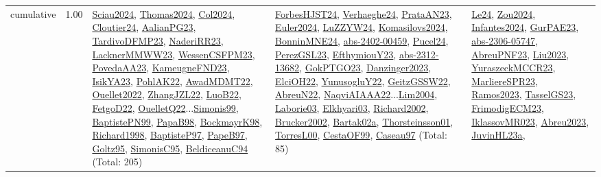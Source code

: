 {\begin{longtable}{p{3cm}r>{\raggedright\arraybackslash}p{6cm}>{\raggedright\arraybackslash}p{6cm}>{\raggedright\arraybackslash}p{8cm}}
\index{cumulative}\index{Constraints!cumulative}cumulative &  1.00 & \hyperref[detail:Sciau2024]{Sciau2024}, \hyperref[detail:Thomas2024]{Thomas2024}, \hyperref[detail:Col2024]{Col2024}, \hyperref[detail:Cloutier24]{Cloutier24}, \hyperref[detail:AalianPG23]{AalianPG23}, \hyperref[detail:TardivoDFMP23]{TardivoDFMP23}, \hyperref[detail:NaderiRR23]{NaderiRR23}, \hyperref[detail:LacknerMMWW23]{LacknerMMWW23}, \hyperref[detail:WessenCSFPM23]{WessenCSFPM23}, \hyperref[detail:PovedaAA23]{PovedaAA23}, \hyperref[detail:KameugneFND23]{KameugneFND23}, \hyperref[detail:IsikYA23]{IsikYA23}, \hyperref[detail:PohlAK22]{PohlAK22}, \hyperref[detail:AwadMDMT22]{AwadMDMT22}, \hyperref[detail:Ouellet2022]{Ouellet2022}, \hyperref[detail:ZhangJZL22]{ZhangJZL22}, \hyperref[detail:LuoB22]{LuoB22}, \hyperref[detail:FetgoD22]{FetgoD22}, \hyperref[detail:OuelletQ22]{OuelletQ22}...\hyperref[detail:Simonis99]{Simonis99}, \hyperref[detail:BaptistePN99]{BaptistePN99}, \hyperref[detail:PapaB98]{PapaB98}, \hyperref[detail:BockmayrK98]{BockmayrK98}, \hyperref[detail:Richard1998]{Richard1998}, \hyperref[detail:BaptisteP97]{BaptisteP97}, \hyperref[detail:PapeB97]{PapeB97}, \hyperref[detail:Goltz95]{Goltz95}, \hyperref[detail:SimonisC95]{SimonisC95}, \hyperref[detail:BeldiceanuC94]{BeldiceanuC94} (Total: 205) & \hyperref[detail:ForbesHJST24]{ForbesHJST24}, \hyperref[detail:Verhaeghe24]{Verhaeghe24}, \hyperref[detail:PrataAN23]{PrataAN23}, \hyperref[detail:Euler2024]{Euler2024}, \hyperref[detail:LuZZYW24]{LuZZYW24}, \hyperref[detail:Komasilovs2024]{Komasilovs2024}, \hyperref[detail:BonninMNE24]{BonninMNE24}, \hyperref[detail:abs-2402-00459]{abs-2402-00459}, \hyperref[detail:Pucel24]{Pucel24}, \hyperref[detail:PerezGSL23]{PerezGSL23}, \hyperref[detail:EfthymiouY23]{EfthymiouY23}, \hyperref[detail:abs-2312-13682]{abs-2312-13682}, \hyperref[detail:GokPTGO23]{GokPTGO23}, \hyperref[detail:Danzinger2023]{Danzinger2023}, \hyperref[detail:ElciOH22]{ElciOH22}, \hyperref[detail:YunusogluY22]{YunusogluY22}, \hyperref[detail:GeitzGSSW22]{GeitzGSSW22}, \hyperref[detail:AbreuN22]{AbreuN22}, \hyperref[detail:NaqviAIAAA22]{NaqviAIAAA22}...\hyperref[detail:Lim2004]{Lim2004}, \hyperref[detail:Laborie03]{Laborie03}, \hyperref[detail:Elkhyari03]{Elkhyari03}, \hyperref[detail:Richard2002]{Richard2002}, \hyperref[detail:Brucker2002]{Brucker2002}, \hyperref[detail:Bartak02a]{Bartak02a}, \hyperref[detail:Thorsteinsson01]{Thorsteinsson01}, \hyperref[detail:TorresL00]{TorresL00}, \hyperref[detail:CestaOF99]{CestaOF99}, \hyperref[detail:Caseau97]{Caseau97} (Total: 85) & \hyperref[detail:Le24]{Le24}, \hyperref[detail:Zou2024]{Zou2024}, \hyperref[detail:Infantes2024]{Infantes2024}, \hyperref[detail:GurPAE23]{GurPAE23}, \hyperref[detail:abs-2306-05747]{abs-2306-05747}, \hyperref[detail:AbreuPNF23]{AbreuPNF23}, \hyperref[detail:Liu2023]{Liu2023}, \hyperref[detail:YuraszeckMCCR23]{YuraszeckMCCR23}, \hyperref[detail:MarliereSPR23]{MarliereSPR23}, \hyperref[detail:Ramos2023]{Ramos2023}, \hyperref[detail:TasselGS23]{TasselGS23}, \hyperref[detail:FrimodigECM23]{FrimodigECM23}, \hyperref[detail:IklassovMR023]{IklassovMR023}, \hyperref[detail:Abreu2023]{Abreu2023}, \hyperref[detail:JuvinHL23a]{JuvinHL23a}, 
\end{longtable}}
